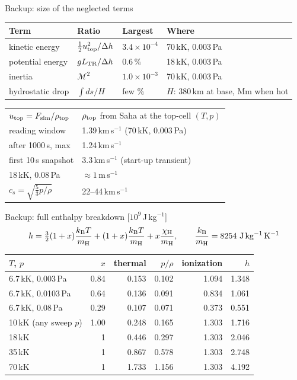 \documentclass[aspectratio=169,10pt]{beamer}
\newcommand{\LTR}{L_{\rm TR}}
\newcommand{\Fsim}{F_{\rm sim}}
\newcommand{\kB}{k_{\rm B}}
\newcommand{\mH}{m_{\rm H}}
\newcommand{\chiH}{\chi_{\rm H}}
\begin{document}
\begin{frame}{Backup: size of the neglected terms}
  \footnotesize
  \begin{center}
    \begin{tabular}{@{}llll@{}}
      \toprule
      Term & Ratio & Largest & Where \\
      \midrule
      kinetic energy & $\tfrac12u_{\rm top}^2/\Delta h$ & $3.4\times10^{-4}$ &
        70\,kK, 0.003\,Pa \\
      potential energy & $g\LTR/\Delta h$ & $0.6\,\%$ & 18\,kK, 0.003\,Pa \\
      inertia & $\mathcal{M}^2$ & $1.0\times10^{-3}$ & 70\,kK, 0.003\,Pa \\
      hydrostatic drop & $\int ds/H$ & few \% & $H$: 380\,km at base, Mm when hot \\
      \bottomrule
    \end{tabular}
  \end{center}
  \vspace{6pt}
  \begin{tabular}{@{}ll@{}}
    $u_{\rm top} = \Fsim/\rho_{\rm top}$ & $\rho_{\rm top}$ from Saha at the
      top-cell $(T,p)$ \\
    reading window & 1.39\,km\,s$^{-1}$ (70\,kK, 0.003\,Pa) \\
    after 1000\,s, max & 1.24\,km\,s$^{-1}$ \\
    first 10\,s snapshot & 3.3\,km\,s$^{-1}$ (start-up transient) \\
    18\,kK, 0.08\,Pa & $\approx 1$\,m\,s$^{-1}$ \\
    $c_s = \sqrt{\tfrac53 p/\rho}$ & 22--44\,km\,s$^{-1}$ \\
  \end{tabular}
\end{frame}

\begin{frame}{Backup: full enthalpy breakdown [$10^9$\,J\,kg$^{-1}$]}
  \small
  \[
    h = \tfrac32(1+x)\frac{\kB T}{\mH} + (1+x)\frac{\kB T}{\mH} + x\frac{\chiH}{\mH},
    \qquad \frac{\kB}{\mH} = 8254\ \mathrm{J\,kg^{-1}\,K^{-1}}
  \]
  \begin{center}
    \begin{tabular}{@{}lrrrrr@{}}
      \toprule
      $T$, $p$ & $x$ & thermal & $p/\rho$ & ionization & $h$ \\
      \midrule
      6.7\,kK, 0.003\,Pa & 0.84 & 0.153 & 0.102 & 1.094 & 1.348 \\
      6.7\,kK, 0.0103\,Pa & 0.64 & 0.136 & 0.091 & 0.834 & 1.061 \\
      6.7\,kK, 0.08\,Pa & 0.29 & 0.107 & 0.071 & 0.373 & 0.551 \\
      \midrule
      10\,kK (any sweep $p$) & 1.00 & 0.248 & 0.165 & 1.303 & 1.716 \\
      18\,kK & 1 & 0.446 & 0.297 & 1.303 & 2.046 \\
      35\,kK & 1 & 0.867 & 0.578 & 1.303 & 2.748 \\
      70\,kK & 1 & 1.733 & 1.156 & 1.303 & 4.192 \\
      \bottomrule
    \end{tabular}
  \end{center}
\end{frame}
\end{document}
